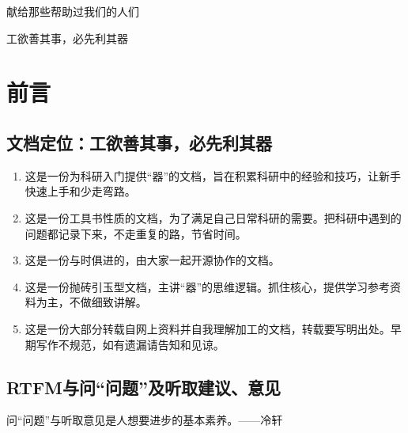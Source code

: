 \documentclass[cn,11pt,chinese,twoside]{elegantbook}
\begin{document}
\maketitle
\frontmatter


\newpage
\thispagestyle{empty}
\noindent\begin{center}
{\fontsize{20pt}{0}\kaishu 献给那些帮助过我们的人们}
\end{center} 

\newpage
\thispagestyle{empty}
\noindent\begin{center}
{\fontsize{20pt}{0}\kaishu 工欲善其事，必先利其器} %
\end{center} 


\tableofcontents
\label{content}
\mainmatter


\chapter*{前言}
\section*{文档定位：工欲善其事，必先利其器}
\begin{enumerate}
\item 这是一份为科研入门提供“器”的文档，旨在积累科研中的经验和技巧，让新手快速上手和少走弯路。
\item 这是一份工具书性质的文档，为了满足自己日常科研的需要。把科研中遇到的问题都记录下来，不走重复的路，节省时间。
\item 这是一份与时俱进的，由大家一起开源协作的文档。
\item 这是一份抛砖引玉型文档，主讲“器”的思维逻辑。抓住核心，提供学习参考资料为主，不做细致讲解。
\item 这是一份大部分转载自网上资料并自我理解加工的文档，转载要写明出处。早期写作不规范，如有遗漏请告知和见谅。
\end{enumerate}


\section*{RTFM与问“问题”及听取建议、意见}
问“问题”与听取意见是人想要进步的基本素养。——冷轩
\end{document}

